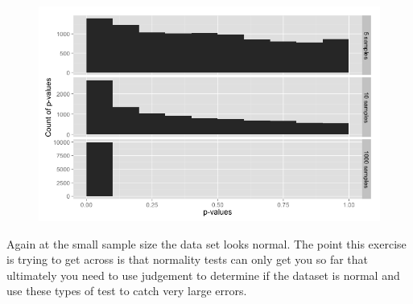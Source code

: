 \documentclass[10pt]{article}
\begin{document}
\begin{figure}[!h]
\includegraphics[scale=0.37]{skewHistPlot.png}
\centering
\end{figure}
Again at the small sample size the data set looks normal. The point this exercise is trying to get across is that normality tests can only get you so far that ultimately you need to use judgement to determine if the dataset is normal and use these types of test to catch very large errors. 
\end{document}
